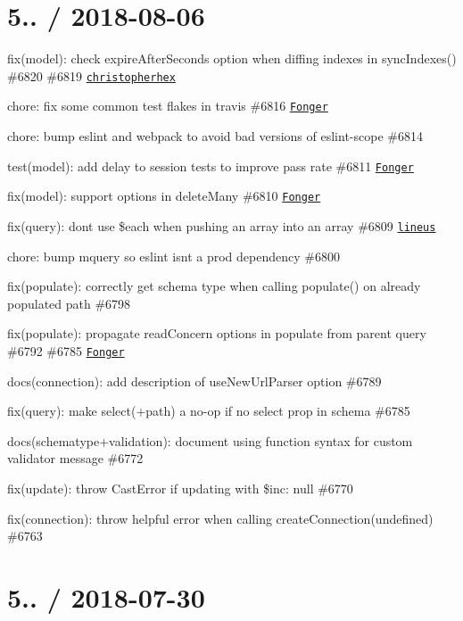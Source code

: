 \section*{5.. / 2018-\/08-\/06 }


\begin{DoxyItemize}
\item fix(model)\+: check {\ttfamily expire\+After\+Seconds} option when diffing indexes in sync\+Indexes() \#6820 \#6819 \href{https://github.com/christopherhex}{\tt christopherhex}
\item chore\+: fix some common test flakes in travis \#6816 \href{https://github.com/Fonger}{\tt Fonger}
\item chore\+: bump eslint and webpack to avoid bad versions of eslint-\/scope \#6814
\item test(model)\+: add delay to session tests to improve pass rate \#6811 \href{https://github.com/Fonger}{\tt Fonger}
\item fix(model)\+: support options in {\ttfamily delete\+Many} \#6810 \href{https://github.com/Fonger}{\tt Fonger}
\item fix(query)\+: don\textquotesingle{}t use \$each when pushing an array into an array \#6809 \href{https://github.com/lineus}{\tt lineus}
\item chore\+: bump mquery so eslint isn\textquotesingle{}t a prod dependency \#6800
\item fix(populate)\+: correctly get schema type when calling {\ttfamily populate()} on already populated path \#6798
\item fix(populate)\+: propagate read\+Concern options in populate from parent query \#6792 \#6785 \href{https://github.com/Fonger}{\tt Fonger}
\item docs(connection)\+: add description of use\+New\+Url\+Parser option \#6789
\item fix(query)\+: make select(\textquotesingle{}+path\textquotesingle{}) a no-\/op if no select prop in schema \#6785
\item docs(schematype+validation)\+: document using function syntax for custom validator message \#6772
\item fix(update)\+: throw Cast\+Error if updating with {\ttfamily \$inc\+: null} \#6770
\item fix(connection)\+: throw helpful error when calling {\ttfamily create\+Connection(undefined)} \#6763
\end{DoxyItemize}

\section*{5.. / 2018-\/07-\/30 }


